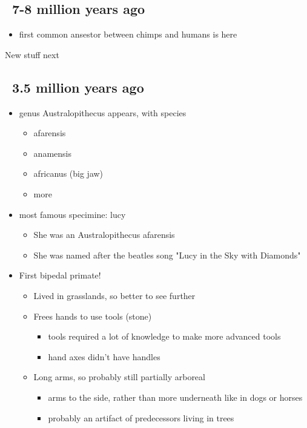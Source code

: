 \documentclass{article}
\theoremstyle{definition}
\begin{document}
\subsection{~7-8 million years ago}
\begin{itemize}
	\item first common ansestor between chimps and humans is here
\end{itemize}

New stuff next
\subsection{~3.5 million years ago}
\begin{itemize}
	\item genus Australopithecus appears, with species
		\begin{itemize}
			\item afarensis
			\item anamensis
			\item africanus (big jaw)
			\item more
		\end{itemize}
	\item most famous specimine: lucy
		\begin{itemize}
			\item She was an Australopithecus afarensis
			\item She was named after the beatles song "Lucy in the Sky with Diamonds"
		\end{itemize}
	\item First bipedal primate!
		\begin{itemize}
			\item Lived in grasslands,  so better to see further
			\item Frees hands to use tools (stone)
				\begin{itemize}
					\item tools required a lot of knowledge  to make more advanced tools
					\item hand axes didn't have handles
				\end{itemize}
			\item Long arms, so probably still partially  arboreal
				\begin{itemize}
					\item arms to the side, rather than more underneath like in dogs or horses
					\item probably an artifact of predecessors living in trees
				\end{itemize}
		\end{itemize}
\end{itemize}
\end{document}
